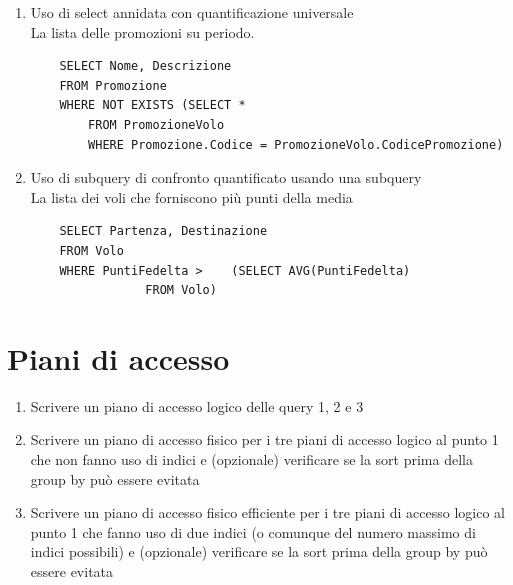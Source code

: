 \documentclass[10pt]{article}
\begin{document}
\begin{enumerate}
	\item Uso di select annidata con quantificazione universale\\
	La lista delle promozioni su periodo.
	\begin{lstlisting}
	SELECT Nome, Descrizione
	FROM Promozione
	WHERE NOT EXISTS (SELECT *
		FROM PromozioneVolo
		WHERE Promozione.Codice = PromozioneVolo.CodicePromozione)
	\end{lstlisting}
	\pagebreak
	\item Uso di subquery di confronto quantificato usando una subquery\\
	La lista dei voli che forniscono più punti della media
	\begin{lstlisting}
	SELECT Partenza, Destinazione
	FROM Volo
	WHERE PuntiFedelta >	(SELECT AVG(PuntiFedelta)
				FROM Volo)
	\end{lstlisting}
	
\end{enumerate}
\pagebreak
\section{Piani di accesso}
\begin{enumerate}
	\item Scrivere un piano di accesso logico delle query 1, 2 e 3
	\item Scrivere un piano di accesso fisico per i tre piani di accesso logico al punto 1 che non fanno uso di indici e (opzionale) verificare se la sort prima della group by può essere evitata
	\item Scrivere un piano di accesso fisico efficiente per i tre piani di accesso logico al punto 1 che fanno uso di due indici (o comunque del numero massimo di indici possibili) e (opzionale) verificare se la sort prima della group by può essere evitata
\end{enumerate}
\end{document}
